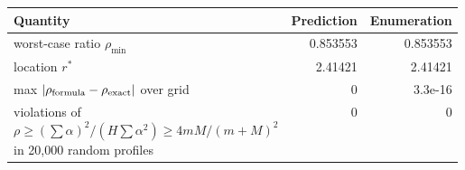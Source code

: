 \begin{tabular}{p{0.58\linewidth}rr}
\toprule
Quantity & Prediction & Enumeration \\
\midrule
worst-case ratio $\rho_{\min}$ & 0.853553 & 0.853553 \\
location $r^\ast$ & 2.41421 & 2.41421 \\
max $|\rho_{\rm formula}-\rho_{\rm exact}|$ over grid & 0 & 3.3e-16 \\
violations of $\rho\ge(\sum\alpha)^2/(H\sum\alpha^2)\ge 4mM/(m+M)^2$ in 20{,}000 random profiles & 0 & 0 \\
\bottomrule
\end{tabular}
